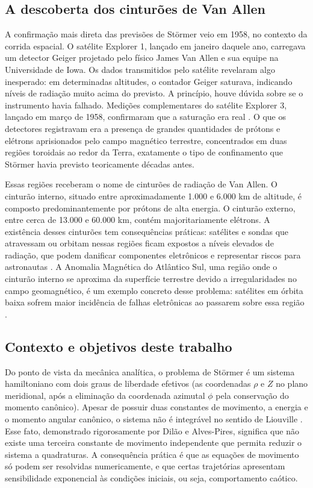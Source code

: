 \documentclass[twocolumn]{rbef}
\begin{document}
\subsection{A descoberta dos cinturões de Van Allen}

A confirmação mais direta das previsões de Störmer veio em 1958, no contexto da corrida espacial. O satélite Explorer 1, lançado em janeiro daquele ano, carregava um detector Geiger projetado pelo físico James Van Allen e sua equipe na Universidade de Iowa. Os dados transmitidos pelo satélite revelaram algo inesperado: em determinadas altitudes, o contador Geiger saturava, indicando níveis de radiação muito acima do previsto. A princípio, houve dúvida sobre se o instrumento havia falhado. Medições complementares do satélite Explorer 3, lançado em março de 1958, confirmaram que a saturação era real \cite{VanAllen}. O que os detectores registravam era a presença de grandes quantidades de prótons e elétrons aprisionados pelo campo magnético terrestre, concentrados em duas regiões toroidais ao redor da Terra, exatamente o tipo de confinamento que Störmer havia previsto teoricamente décadas antes.

Essas regiões receberam o nome de cinturões de radiação de Van Allen. O cinturão interno, situado entre aproximadamente 1.000 e 6.000 km de altitude, é composto predominantemente por prótons de alta energia. O cinturão externo, entre cerca de 13.000 e 60.000 km, contém majoritariamente elétrons. A existência desses cinturões tem consequências práticas: satélites e sondas que atravessam ou orbitam nessas regiões ficam expostos a níveis elevados de radiação, que podem danificar componentes eletrônicos e representar riscos para astronautas \cite{atlantico, ESA, Stassinopoulos}. A Anomalia Magnética do Atlântico Sul, uma região onde o cinturão interno se aproxima da superfície terrestre devido a irregularidades no campo geomagnético, é um exemplo concreto desse problema: satélites em órbita baixa sofrem maior incidência de falhas eletrônicas ao passarem sobre essa região \cite{atlantico}.

\subsection{Contexto e objetivos deste trabalho}

Do ponto de vista da mecânica analítica, o problema de Störmer é um sistema hamiltoniano com dois graus de liberdade efetivos (as coordenadas $\rho$ e $Z$ no plano meridional, após a eliminação da coordenada azimutal $\phi$ pela conservação do momento canônico). Apesar de possuir duas constantes de movimento, a energia e o momento angular canônico, o sistema não é integrável no sentido de Liouville \cite{ruidilao, Saletan}. Esse fato, demonstrado rigorosamente por Dilão e Alves-Pires, significa que não existe uma terceira constante de movimento independente que permita reduzir o sistema a quadraturas. A consequência prática é que as equações de movimento só podem ser resolvidas numericamente, e que certas trajetórias apresentam sensibilidade exponencial às condições iniciais, ou seja, comportamento caótico.
\end{document}
